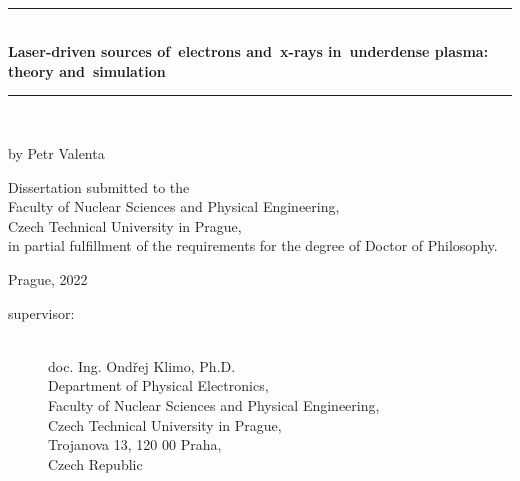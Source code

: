 \documentclass[10pt, a4paper, twoside, openright]{report}
\newcommand{\ctu}{Czech Technical University in Prague}
\newcommand{\fnspe}{Faculty of Nuclear Sciences and Physical Engineering}
\newcommand{\dpe}{Department of Physical Electronics}
\newcommand{\projecttitle}{Laser-driven sources of~electrons and~x-rays in~underdense plasma: theory and~simulation}
\newcommand{\klimo}{doc. Ing. Ondřej Klimo, Ph.D.}
\begin{document}
\pagestyle{empty}



\begin{titlepage}

\begin{center}
\epsfysize=35mm  \\[15mm]
\end{center}

\begin{center}
\begin{spacing}{2.0}
{\rule{125mm}{2pt}} \\[4mm]
{\huge \bf \projecttitle} \\
{\rule{125mm}{2pt}} \\[5mm]
\end{spacing}
{\LARGE by Petr Valenta} \\
\end{center}

\vfill

\begin{center}
\parbox{0.75\textwidth}{\noindent \centering \large Dissertation submitted to the \\ \fnspe, \\ \ctu, \\ in partial fulfillment of the requirements for the degree of Doctor of Philosophy.}
\end{center}

\vfill

\begin{center}
{\large Prague, 2022}
\end{center}

\end{titlepage}


\newpage
\rule{0pt}{0pt}
\vfill
\begin{description}
	\item[supervisor:]\ \\
	\klimo \\
	\dpe, \\
	\fnspe, \\ 
	\ctu, \\
	Trojanova 13, 120 00 Praha, \\
	Czech Republic
\end{description}
\end{document}
